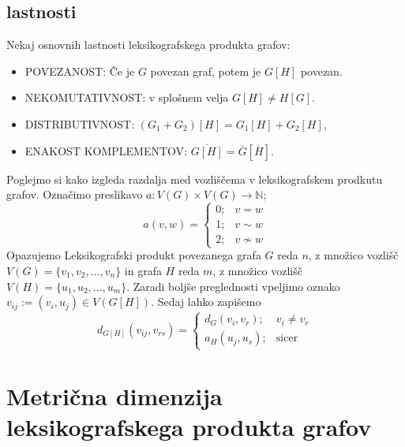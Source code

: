 \documentclass[mat1, tisk]{fmfdelo}
\begin{document}
\subsection{lastnosti}
Nekaj osnovnih lastnosti leksikografskega produkta grafov:
\begin{itemize}
    \item POVEZANOST: Če je $G$ povezan graf, potem je $G[H]$ povezan. 
    \item NEKOMUTATIVNOST: v splošnem velja $G[H] \neq H[G].$
    \item DISTRIBUTIVNOST: $(G_1 + G_2)[H] = G_1[H] + G_2[H],$ 
    \item ENAKOST KOMPLEMENTOV: $\overline{G[H]} = \overline{G} [\overline{H}].$
\end{itemize}

Poglejmo si kako izgleda razdalja med vozliščema v leksikografskem prodkutu grafov. 
Označimo preslikavo  $a: V(G) \times V(G) \rightarrow \mathbb{N};$   
$$ a(v, w) = \begin{cases}
    0; & v = w \\
    1; & v \sim w \\
    2; & v \not\sim w
\end{cases} 
$$ 
Opazujemo Leksikografski produkt povezanega grafa $G$ reda $n$, z množico vozlišč
$V(G) = \{v_1, v_2, ... , v_n \}$ in grafa $H$ reda $m$, z množico vozlišč 
$V(H) = \{u_1, u_2, ... , u_m \}$. Zaradi boljše preglednosti vpeljimo oznako 
$v_{ij} := (v_i, u_j) \in V(G[H]).$
Sedaj lahko zapišemo
$$
d_{G[H]}(v_{ij}, v_{rs}) = \begin{cases}
        d_G(v_i, v_r); & v_i \neq v_r \\
        a_H(u_j, u_s); & \text{sicer}
    \end{cases}
$$ 




\section{Metrična dimenzija leksikografskega produkta grafov}
 

\end{document}
